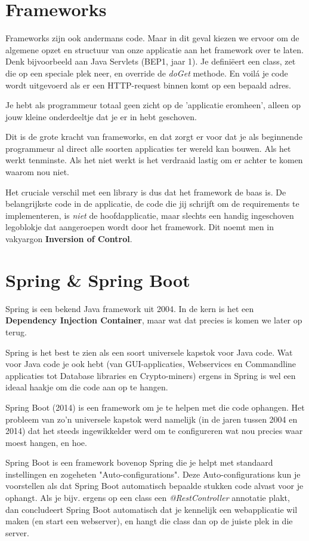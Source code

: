 \section{Frameworks}

Frameworks zijn ook andermans code. Maar in dit geval kiezen we ervoor om de algemene opzet en structuur van 
onze applicatie aan het framework over te laten. Denk bijvoorbeeld aan Java Servlets (BEP1, jaar 1).
Je definiëert een class, zet die op een speciale plek neer, en override de \emph{doGet} methode. En voilá je code
wordt uitgevoerd als er een HTTP-request binnen komt op een bepaald adres.

Je hebt als programmeur totaal geen zicht op de 'applicatie eromheen', alleen op jouw kleine onderdeeltje dat je er 
in hebt geschoven.

Dit is de grote kracht van frameworks, en dat zorgt er voor dat je als beginnende programmeur al direct alle soorten
applicaties ter wereld kan bouwen. Als het werkt tenminste. Als het niet werkt is het verdraaid lastig om er achter 
te komen waarom nou niet.

Het cruciale verschil met een library is dus dat het framework de baas is. De belangrijkste code in de applicatie, 
de code die jij schrijft om de requirements te implementeren, is \emph{niet} de hoofdapplicatie, maar slechts een
handig ingeschoven legoblokje dat aangeroepen wordt door het framework. Dit noemt men in vakyargon \textbf{Inversion of Control}.

\section{Spring \& Spring Boot}

Spring is een bekend Java framework uit 2004. 
In de kern is het een \textbf{Dependency Injection Container}, maar wat dat precies is komen we later op terug.

Spring is het best te zien als een soort universele kapstok voor Java code. Wat voor Java code je ook hebt
(van GUI-applicaties, Webservices en Commandline applicaties tot Database libraries en Crypto-miners) ergens in Spring
is wel een ideaal haakje om die code aan op te hangen. 

Spring Boot (2014) is een framework om je te helpen met die code ophangen. Het probleem van zo'n universele kapstok
werd namelijk (in de jaren tussen 2004 en 2014) dat het steeds ingewikkelder werd om te configureren wat nou precies
waar moest hangen, en hoe.

Spring Boot is een framework bovenop Spring die je helpt met standaard instellingen en zogeheten "Auto-configurations".
Deze Auto-configurations kun je voorstellen als dat Spring Boot automatisch bepaalde stukken code alvast voor je ophangt.
Als je bijv. ergens op een class een \emph{@RestController} annotatie plakt, dan concludeert Spring Boot automatisch dat
je kennelijk een webapplicatie wil maken (en start een webserver), en hangt die class dan op de juiste plek in die server.


